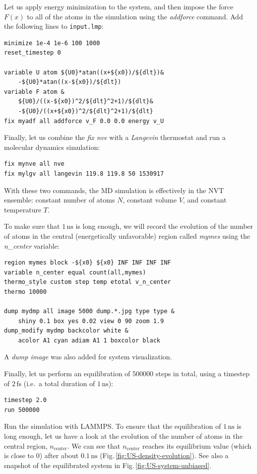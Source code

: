 \documentclass[9pt,tutorial]{livecoms}
\newcommand{\flecmd}[1]{\textcolor{command}{\texttt{#1}}} %
\begin{document}
Let us apply energy minimization to the system, and then impose the force $F(x)$
to all of the atoms in the simulation using the \textit{addforce} command. Add
the following lines to \flecmd{input.lmp}:
\begin{lstlisting}
minimize 1e-4 1e-6 100 1000
reset_timestep 0

variable U atom ${U0}*atan((x+${x0})/${dlt})&
    -${U0}*atan((x-${x0})/${dlt})
variable F atom &
    ${U0}/((x-${x0})^2/${dlt}^2+1)/${dlt}&
    -${U0}/((x+${x0})^2/${dlt}^2+1)/${dlt}
fix myadf all addforce v_F 0.0 0.0 energy v_U
\end{lstlisting}
Finally, let us combine the \textit{fix nve} with a \textit{Langevin} thermostat
and run a molecular dynamics simulation:
\begin{lstlisting}
fix mynve all nve
fix mylgv all langevin 119.8 119.8 50 1530917
\end{lstlisting}
With these two commands, the MD simulation
is effectively in the NVT ensemble: constant number of atoms $N$, constant volume
$V$, and constant temperature $T$.

To make sure that $1\,\text{ns}$ is long enough, we will record the evolution of
the number of atoms in the central (energetically unfavorable) region called \textit{mymes}
using the \textit{n\_center} variable:
\begin{lstlisting}
region mymes block -${x0} ${x0} INF INF INF INF
variable n_center equal count(all,mymes)
thermo_style custom step temp etotal v_n_center
thermo 10000

dump mydmp all image 5000 dump.*.jpg type type &
    shiny 0.1 box yes 0.02 view 0 90 zoom 1.9
dump_modify mydmp backcolor white &
    acolor A1 cyan adiam A1 1 boxcolor black
\end{lstlisting}
A \textit{dump image} was also added for system visualization.

Finally, let us perform an equilibration of 500000 steps
in total, using a timestep of $2\,\text{fs}$ (i.e.~a total duration of $1\,\text{ns}$):
\begin{lstlisting}
timestep 2.0
run 500000
\end{lstlisting}
Run the simulation with LAMMPS. To ensure that the equilibration of $1\,\text{ns}$ is long
enough, let us have a look at the evolution of the number of atoms in the central region,
$n_\mathrm{center}$. We can see that $n_\mathrm{center}$ reaches
its equilibrium value (which is close to 0) after about $0.1\,\text{ns}$
(Fig.\,\ref{fig:US-density-evolution}). See also a snapshot of the equilibrated
system in Fig.\,\ref{fig:US-system-unbiased}.
\end{document}
